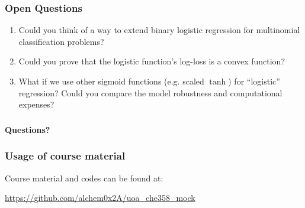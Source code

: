 \documentclass[10pt,aspectratio=169]{beamer}
\begin{document}
      \begin{frame}
        \frametitle{Open Questions}

        \begin{enumerate}
          \vfill \item Could you think of a way to extend binary
          logistic regression for multinomial classification problems?

          
          \vfill \item Could you prove that the logistic function's
          log-loss is a convex function?

          
          \vfill \item What if we use other sigmoid functions
          (e.g. scaled $\tanh$) for ``logistic'' regression? Could you
          compare the model robustness and computational expenses?
        
        \end{enumerate}
        
      \end{frame}

      \begin{frame}[c]
        \frametitle{}
        \centering \vspace{3em} {\Huge \bfseries Questions?}
      \end{frame}

      \begin{frame}
        \frametitle{Usage of course material}

        Course material and codes can be found at:

        \url{https://github.com/alchem0x2A/uoa_che358_mock}

        
      \end{frame}
\end{document}
